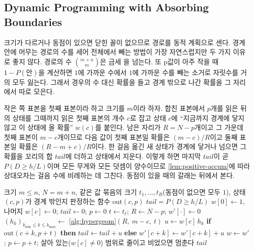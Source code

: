 \subsection{Dynamic Programming with Absorbing Boundaries}

크기가 다르거나 동점이 있으면 닫힌 꼴이 없으므로 경로를 동적 계획으로 센다. 경계 안에 머무는 경로의 수를 세어 전체에서 빼는 방법이 가장 자연스럽지만 두 가지 이유로 좋지 않다. 경로의 수 $\binom{m+n}m$은 금세 을 넘는다. 또 p값이 아주 작을 때 $1-P(\text{안})$을 계산하면 $1$에 가까운 수에서 $1$에 가까운 수를 빼는 소거로 자릿수를 거의 모두 잃는다. 그래서 경우의 수 대신 확률을 들고 경계 밖으로 나간 확률을 그 자리에서 따로 모은다.

작은 쪽 표본을 첫째 표본이라 하고 크기를 $m$이라 하자. 합친 표본에서 $p$개를 읽은 뒤의 상태를 그때까지 읽은 첫째 표본의 개수 $c$로 잡고 상태 $c$에 ``지금까지 경계에 닿지 않고 이 상태에 올 확률'' $w(c)$를 붙인다. 남은 자리가 $R=N-p$개이고 그 가운데 첫째 표본이 $m-c$개이므로 다음 값이 첫째 표본일 확률은 $(m-c)/R$이고 둘째 표본일 확률은 $(R-m+c)/R$이다. 한 걸음 옮긴 새 상태가 경계에 닿거나 넘으면 그 확률을 꼬리의 합 $\mathit{tail}$에 더하고 상태에서 지운다. 이렇게 하면 마지막 $\mathit{tail}$이 곧 $P(D\ge h/L)$이며 모든 무게와 모든 덧셈이 양수이므로 \cref{lem:positive-accum}에 따라 상대오차는 걸음 수에 비례하는 데 그친다. 동점이 있을 때의 갈래는 뒤에서 본다.

\begin{algorithm}[htbp]
\begin{algorithmic}[1]
\Require 크기 $m\le n$, $N=m+n$, 같은 값 묶음의 크기 $t_1,\dots,t_B$(동점이 없으면 모두 $1$), 상태 $(c,p)$가 경계 밖인지 판정하는 함수 $\mathrm{out}(c,p)$
\Ensure $\mathit{tail}=P(D\ge h/L)$
\State $w[0]\gets1$, 나머지 $w[c]\gets0$; $\mathit{tail}\gets0$; $p\gets0$
  \State $t\gets t_\ell$; $R\gets N-p$; $w'[\cdot]\gets0$
    \State $(h_k)_{k_{\min}\le k\le k_{\max}}\gets$ \cref{alg:hypergeom}$(R,\ m-c,\ t)$ 
     
      \State $u\gets w[c]\,h_k$
      \State \textbf{if} $\mathrm{out}(c+k,p+t)$ \textbf{then} $\mathit{tail}\gets\mathit{tail}+u$ \textbf{else} $w'[c+k]\gets w'[c+k]+u$
    \EndFor
  \EndFor
  \State $w\gets w'$; $p\gets p+t$; 살아 있는($w[c]\ne0$) 범위로 줄이고 비었으면 멈춘다
\EndFor
\State \Return $\mathit{tail}$
\end{algorithmic}
\caption{흡수 경계가 있는 두 표본 Kolmogorov--Smirnov 분포 (stardust 의 )}
\label{alg:ks-absorb}
\end{algorithm}

